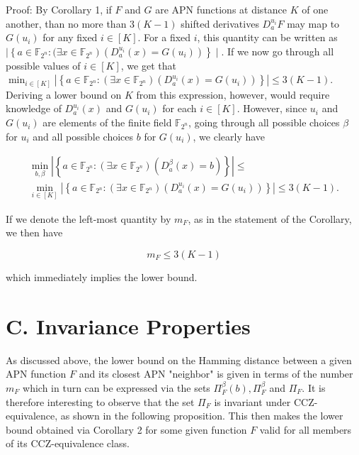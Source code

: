 \documentclass[10pt]{article}
\begin{document}
Proof: By Corollary 1, if $F$ and $G$ are APN functions at distance $K$ of one another, than no more than $3(K-1)$ shifted derivatives $D_{a}^{u_{i}} F$ may map to $G\left(u_{i}\right)$ for any fixed $i \in[K]$. For a fixed $i$, this quantity can be written as $\mid\left\{a \in \mathbb{F}_{2^{n}}:(\exists x \in\right. \left.\left.\mathbb{F}_{2^{n}}\right)\left(D_{a}^{u_{i}}(x)=G\left(u_{i}\right)\right)\right\} \mid$. If we now go through all possible values of $i \in[K]$, we get that\\
$\min _{i \in[K]}\left|\left\{a \in \mathbb{F}_{2^{n}}:\left(\exists x \in \mathbb{F}_{2^{n}}\right)\left(D_{a}^{u_{i}}(x)=G\left(u_{i}\right)\right)\right\}\right| \leq 3(K-1)$.\\
Deriving a lower bound on $K$ from this expression, however, would require knowledge of $D_{a}^{u_{i}}(x)$ and $G\left(u_{i}\right)$ for each $i \in[K]$. However, since $u_{i}$ and $G\left(u_{i}\right)$ are elements of the finite field $\mathbb{F}_{2^{n}}$, going through all possible choices $\beta$ for $u_{i}$ and all possible choices $b$ for $G\left(u_{i}\right)$, we clearly have

$$
\begin{gathered}
\min _{b, \beta}\left|\left\{a \in \mathbb{F}_{2^{n}}:\left(\exists x \in \mathbb{F}_{2^{n}}\right)\left(D_{a}^{\beta}(x)=b\right)\right\}\right| \leq \\
\min _{i \in[K]}\left|\left\{a \in \mathbb{F}_{2^{n}}:\left(\exists x \in \mathbb{F}_{2^{n}}\right)\left(D_{a}^{u_{i}}(x)=G\left(u_{i}\right)\right)\right\}\right| \leq 3(K-1) .
\end{gathered}
$$

If we denote the left-most quantity by $m_{F}$, as in the statement of the Corollary, we then have

$$
m_{F} \leq 3(K-1)
$$

which immediately implies the lower bound.

\section*{C. Invariance Properties}
As discussed above, the lower bound on the Hamming distance between a given APN function $F$ and its closest APN "neighbor" is given in terms of the number $m_{F}$ which in turn can be expressed via the sets $\Pi_{F}^{\beta}(b), \Pi_{F}^{\beta}$ and $\Pi_{F}$. It is therefore interesting to observe that the set $\Pi_{F}$ is invariant under CCZ-equivalence, as shown in the following proposition. This then makes the lower bound obtained via Corollary 2 for some given function $F$ valid for all members of its CCZ-equivalence class.
\end{document}
